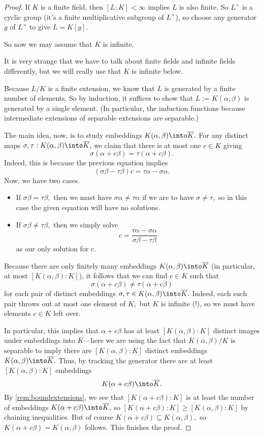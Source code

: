 \documentclass[../notes.tex]{subfiles}
\begin{document}
\begin{proof}
	If $K$ is a finite field, then $[L:K]<\infty$ implies $L$ is also finite. So $L^\times$ is a cyclic group (it's a finite multiplicative subgroup of $L^\times$), so choose any generator $g$ of $L^\times$ to give $L=K[g].$

	So now we may assume that $K$ is infinite.
	\begin{remark}
		It is very strange that we have to talk about finite fields and infinite fields differently, but we will really use that $K$ is infinite below.
	\end{remark}
	Because $L/K$ is a finite extension, we know that $L$ is generated by a finite number of elements. So by induction, it suffices to show that $L:=K(\alpha,\beta)$ is generated by a single element. (In particular, the induction functions because intermediate extensions of separable extensions are separable.)
	
	The main idea, now, is to study embeddings $K(\alpha,\beta)\into\overline K.$ For any distinct maps $\sigma,\tau:K(\alpha,\beta)\into\overline K,$ we claim that there is at most one $c\in K$ giving
	\[\sigma(\alpha+c\beta)=\tau(\alpha+c\beta).\]
	Indeed, this is because the previous equation implies
	\[(\sigma\beta-\tau\beta)c=\tau\alpha-\sigma\alpha.\]
	Now, we have two cases.
	\begin{itemize}
		\item If $\sigma\beta=\tau\beta,$ then we must have $\sigma\alpha\ne\tau\alpha$ if we are to have $\sigma\ne\tau,$ so in this case the given equation will have no solutions.
		\item If $\sigma\beta\ne\tau\beta,$ then we simply solve
		\[c=\frac{\tau\alpha-\sigma\alpha}{\sigma\beta-\tau\beta}\]
		as our only solution for $c.$
	\end{itemize}
	Because there are only finitely many embeddings $K(\alpha,\beta)\into\overline K$ (in particular, at most $[K(\alpha,\beta):K]$), it follows that we can find $c\in K$ such that
	\[\sigma(\alpha+c\beta)\ne\tau(\alpha+c\beta)\]
	for each pair of distinct embeddings $\sigma,\tau\in K(\alpha,\beta)\into\overline K.$ Indeed, each such pair throws out at most one element of $K,$ but $K$ is infinite (!), so we must have elements $c\in K$ left over.

	In particular, this implies that $\alpha+c\beta$ has at least $[K(\alpha,\beta):K]$ distinct images under embeddings into $\overline K$---here we are using the fact that $K(\alpha,\beta)/K$ is separable to imply there are $[K(\alpha,\beta):K]$ distinct embeddings $K(\alpha,\beta)\into\overline K.$ Thus, by tracking the generator there are at least $[K(\alpha,\beta):K]$ embeddings
	\[K(\alpha+c\beta)\into\overline K.\]
	By \autoref{rem:boundextensions}, we see that $[K(\alpha+c\beta):K]$ is at least the number of embeddings $K(\alpha+c\beta)\into\overline K,$ so $[K(\alpha+c\beta):K]\ge[K(\alpha,\beta):K]$ by chaining inequalities. But of course $K(\alpha+c\beta)\subseteq K(\alpha,\beta),$ so $K(\alpha+c\beta)=K(\alpha,\beta)$ follows. This finishes the proof.
\end{proof}
\end{document}
